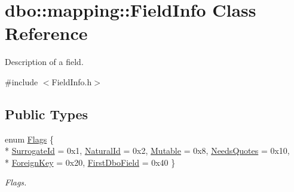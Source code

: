 \hypertarget{classdbo_1_1mapping_1_1_field_info}{\section{dbo\+:\+:mapping\+:\+:Field\+Info Class Reference}
\label{classdbo_1_1mapping_1_1_field_info}
}


Description of a field.  




{\ttfamily \#include $<$Field\+Info.\+h$>$}

\subsection*{Public Types}
\begin{DoxyCompactItemize}
\item 
enum \hyperlink{classdbo_1_1mapping_1_1_field_info_ace9623c079f46b2c932e339e68c001dd}{Flags} \{ \\*
\hyperlink{classdbo_1_1mapping_1_1_field_info_ace9623c079f46b2c932e339e68c001dda6de7a4ea4dae9a1d3ee99bdfe62ea265}{Surrogate\+Id} = 0x1, 
\hyperlink{classdbo_1_1mapping_1_1_field_info_ace9623c079f46b2c932e339e68c001ddadf26125864257adc9fd3814a3ea24582}{Natural\+Id} = 0x2, 
\hyperlink{classdbo_1_1mapping_1_1_field_info_ace9623c079f46b2c932e339e68c001ddab3033d795a06974f753a927b829b237c}{Mutable} = 0x8, 
\hyperlink{classdbo_1_1mapping_1_1_field_info_ace9623c079f46b2c932e339e68c001dda488d560d149ccf2cbc43042da063f80d}{Needs\+Quotes} = 0x10, 
\\*
\hyperlink{classdbo_1_1mapping_1_1_field_info_ace9623c079f46b2c932e339e68c001dda07e0b2f157b634fe26a5c916182ec1b3}{Foreign\+Key} = 0x20, 
\hyperlink{classdbo_1_1mapping_1_1_field_info_ace9623c079f46b2c932e339e68c001dda432cc6112f7921b2211e8ddc78c73b8d}{First\+Dbo\+Field} = 0x40
 \}
\begin{DoxyCompactList}\small\item\em Flags. \end{DoxyCompactList}\end{DoxyCompactItemize}

